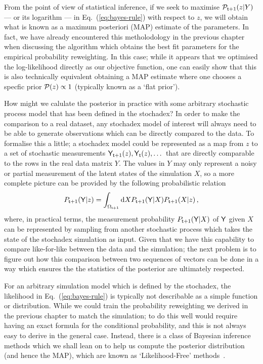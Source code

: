 From the point of view of statistical inference, if we seek to maximise ${\cal P}_{{\sf t}+1}(z \vert Y)$ --- or its logarithm --- in Eq.~(\ref{eq:bayes-rule}) with respect to $z$, we will obtain what is known as a maximum posteriori (MAP) estimate of the parameters. In fact, we have already encountered this metholodology in the previous chapter when discussing the algorithm which obtains the best fit parameters for the empirical probability reweighting. In this case; while it appears that we optimised the log-likelihood directly as our objective function, one can easily show that this is also technically equivalent obtaining a MAP estimate where one chooses a specfic prior ${\cal P} (z) \propto 1$ (typically known as a `flat prior').

How might we calulate the posterior in practice with some arbitrary stochastic process model that has been defined in the stochadex? In order to make the comparison to a real dataset, any stochadex model of interest will always need to be able to generate observations which can be directly compared to the data. To formalise this a little; a stochadex model could be represented as a map from $z$ to a set of stochastic measurements ${\sf Y}_{{\sf t}+1}(z), {\sf Y}_{{\sf t}}(z), \dots$ that are directly comparable to the rows in the real data matrix $Y$. The values in $Y$ may only represent a noisy or partial measurement of the latent states of the simulation $X$, so a more complete picture can be provided by the following probabilistic relation
\begin{align}
P_{{\sf t}+1}({\sf Y} \vert z) = \int_{\Omega_{{\sf t}+1}}{\rm d}X P_{{\sf t}+1}({\sf Y} \vert X)P_{{\sf t}+1}(X \vert z) \,, \label{eq:simulation-measurement}
\end{align}
where, in practical terms, the measurement probability $P_{{\sf t}+1}({\sf Y} \vert X)$ of ${\sf Y}$ given $X$ can be represented by sampling from another stochastic process which takes the state of the stochadex simulation as input. Given that we have this capability to compare like-for-like between the data and the simulation; the next problem is to figure out how this comparison between two sequences of vectors can be done in a way which ensures the the statistics of the posterior are ultimately respected. 

For an arbitrary simulation model which is defined by the stochadex, the likelihood in Eq.~(\ref{eq:bayes-rule}) is typically not describable as a simple function or distribution. While we could train the probability reweighting we derived in the previous chapter to match the simulation; to do this well would require having an exact formula for the conditional probability, and this is not always easy to derive in the general case. Instead, there is a class of Bayesian inference methods which we shall lean on to help us compute the posterior distribution (and hence the MAP), which are known as `Likelihood-Free' methods~\cite{sisson2018handbook,price2018bayesian,wood2010statistical,drovandi2022comparison}.

